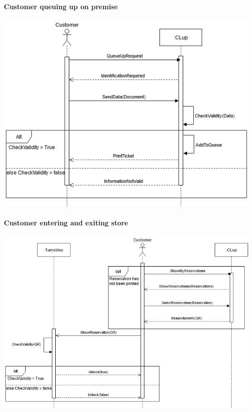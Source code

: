 \paragraph{Customer queuing up on premise}
\begin{flushleft}
	\includegraphics[scale=0.5]{Images/UseCase5Diagram.png}
\end{flushleft}

\paragraph{Customer entering and exiting store}
\begin{flushleft}
	\includegraphics[scale=0.5]{Images/UseCase6-7Diagram.png}
\end{flushleft}

